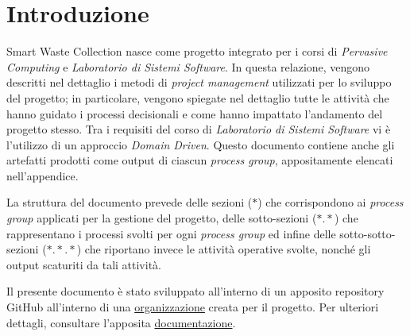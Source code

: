 \section*{Introduzione}
\label{sec:introduction}

Smart Waste Collection nasce come progetto integrato per i corsi di \textit{Pervasive Computing} e \textit{Laboratorio di Sistemi Software}.
In questa relazione, vengono descritti nel dettaglio i metodi di \textit{project management} utilizzati per lo sviluppo del progetto; in particolare, vengono spiegate nel dettaglio tutte le attività che hanno guidato i processi decisionali e come hanno impattato l'andamento del progetto stesso.
Tra i requisiti del corso di \textit{Laboratorio di Sistemi Software} vi è l'utilizzo di un approccio \textit{Domain Driven}. Questo documento contiene anche gli artefatti prodotti come output di ciascun \textit{process group}, appositamente elencati nell'appendice.

La struttura del documento prevede delle sezioni ($*$) che corrispondono ai \textit{process group} applicati per la gestione del progetto, delle sotto-sezioni ($*.*$) che rappresentano i processi svolti per ogni \textit{process group} ed infine delle sotto-sotto-sezioni ($*.*.*$) che riportano invece le attività operative svolte, nonché gli output scaturiti da tali attività.

Il presente documento è stato sviluppato all'interno di un apposito repository GitHub all'interno di una \href{https://github.com/SmartWasteCollection}{organizzazione} creata per il progetto. Per ulteriori dettagli, consultare l'apposita \href{https://smartwastecollection.github.io/documentation/}{documentazione}.